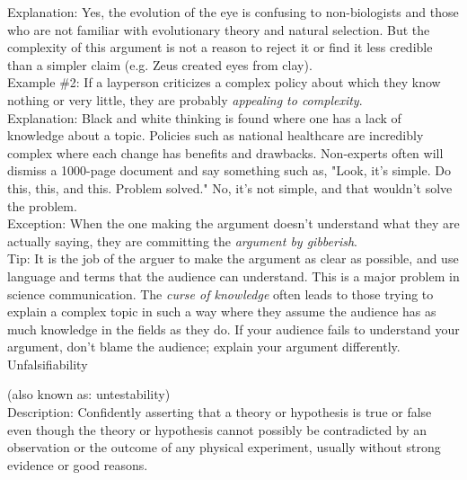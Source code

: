 \documentclass[a4paper,12pt,single,pdftex]{scrbook}
\begin{document}
    
      Explanation: Yes, the evolution of the eye is confusing to non-biologists and those who are not familiar with evolutionary theory and natural selection. But the complexity of this argument is not a reason to reject it or find it less credible than a simpler claim (e.g. Zeus created eyes from clay).
    \\

    
      Example \#2: If a layperson criticizes a complex policy about which they know nothing or very little, they are probably {\it appealing to complexity}.
    \\

    
      Explanation: Black and white thinking is found where one has a lack of knowledge about a topic. Policies such as national healthcare are incredibly complex where each change has benefits and drawbacks. Non-experts often will dismiss a 1000-page document and say something such as, "Look, it's simple. Do this, this, and this. Problem solved." No, it's not simple, and that wouldn't solve the problem.
    \\

    
      Exception: When the one making the argument doesn't understand what they are actually saying, they are committing the {\it argument by gibberish}.
    \\

    
      Tip: It is the job of the arguer to make the argument as clear as possible, and use language and terms that the audience can understand. This is a major problem in science communication. The {\it curse of knowledge} often leads to those trying to explain a complex topic in such a way where they assume the audience has as much knowledge in the fields as they do. If your audience fails to understand your argument, don't blame the audience;  explain your argument differently.
    \\

  

Unfalsifiability
    
      (also known as: untestability)
    \\

  
    
      
        Description: Confidently asserting that a theory or hypothesis is true or false even though the theory or hypothesis cannot possibly be contradicted by an observation or the outcome of any physical experiment, usually without strong evidence or good reasons.
      \\
\end{document}
